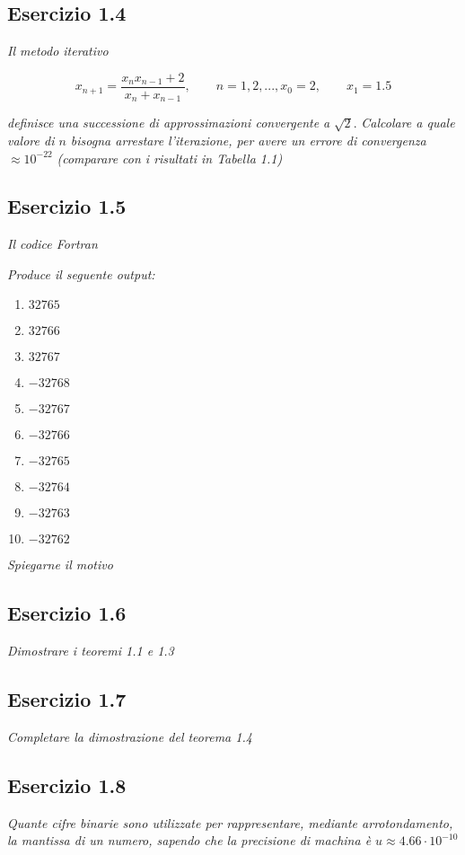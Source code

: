 \subsection{Esercizio 1.4}

\emph{Il metodo iterativo}

$$x_{n+1} = \frac{x_{n}x_{n-1}+2}{x_{n}+x_{n-1}}, \qquad n = 1, 2, ..., x_{0} = 2,\qquad x_{1} = 1.5 $$

\emph{definisce una successione di approssimazioni convergente a} $\sqrt{2}$. \emph{Calcolare a quale valore di $ n $ bisogna arrestare l'iterazione, per avere un errore di convergenza}
$\approx 10^{-22}$ \emph{(comparare con i risultati in Tabella 1.1)}

\subsection{Esercizio 1.5}
\emph{Il codice Fortran}

\emph{Produce il seguente output:}
\begin{enumerate}
\item $32765$
\item $32766$
\item $32767$
\item $-32768$
\item $-32767$
\item $-32766$
\item $-32765$
\item $-32764$
\item $-32763$
\item $-32762$
\end{enumerate}
\emph{Spiegarne il motivo}


\subsection{Esercizio 1.6}
\emph{Dimostrare i teoremi 1.1 e 1.3}
\subsection{Esercizio 1.7}
\emph{Completare la dimostrazione del teorema 1.4}

\subsection{Esercizio 1.8}
\emph{Quante cifre binarie sono utilizzate per rappresentare, mediante arrotondamento, la mantissa di un numero, sapendo che la precisione di machina è $ u \approx 4.66 \cdot 10^{-10} $}

